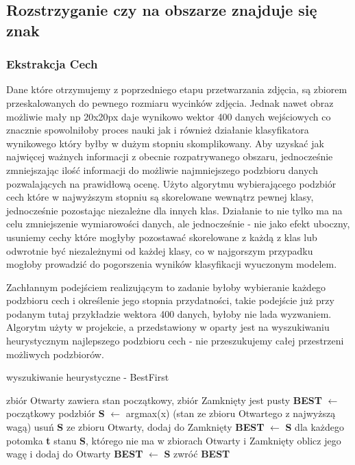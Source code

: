 \documentclass{classrep}
\begin{document}
\subsection{Rozstrzyganie czy na obszarze znajduje się znak}

\subsubsection{Ekstrakcja Cech} 
\label{cfseval}
Dane które otrzymujemy z poprzedniego etapu przetwarzania zdjęcia, są zbiorem przeskalowanych do pewnego rozmiaru wycinków zdjęcia. Jednak nawet obraz możliwie mały np 20x20px daje wynikowo wektor 400 danych wejściowych co znacznie spowolniłoby proces nauki jak i również działanie klasyfikatora wynikowego który byłby w dużym stopniu skomplikowany. Aby uzyskać jak najwięcej ważnych informacji z obecnie rozpatrywanego obszaru, jednocześnie  zmniejszając ilość informacji do możliwie najmniejszego podzbioru danych pozwalających na prawidłową ocenę. Użyto algorytmu wybierającego podzbiór cech które w najwyższym stopniu są skorelowane wewnątrz pewnej klasy, jednocześnie pozostając niezależne dla innych klas. Działanie to nie tylko ma na celu zmniejszenie wymiarowości danych, ale jednocześnie - nie jako efekt uboczny, usuniemy cechy które mogłyby pozostawać skorelowane z każdą z klas lub odwrotnie być niezależnymi od każdej klasy,  co w najgorszym przypadku mogłoby prowadzić do pogorszenia wyników klasyfikacji wyuczonym modelem.

Zachłannym podejściem realizującym to zadanie byłoby wybieranie każdego podzbioru cech i określenie jego stopnia przydatności, takie podejście już przy podanym tutaj przykładzie wektora 400 danych, byłoby nie lada wyzwaniem.\\ 
Algorytm użyty w projekcie, a przedstawiony w \cite{Hall1998} oparty jest na wyszukiwaniu heurystycznym najlepszego podzbioru cech - nie przeszukujemy całej przestrzeni możliwych podzbiorów. 
\begin{algorithm}
\caption{wyszukiwanie heurystyczne - BestFirst}
\label{bestfirst}
\begin{algorithmic}[1]
\STATE zbiór Otwarty zawiera stan początkowy, zbiór Zamknięty jest pusty
\STATE \textbf{BEST} $\leftarrow$ początkowy podzbiór
\STATE \textbf{S} $\leftarrow$ argmax(x) (stan ze zbioru Otwartego z najwyższą wagą)
\STATE usuń \textbf{S} ze zbioru Otwarty, dodaj do Zamknięty
\STATE \textbf{BEST} $\leftarrow$ \textbf{S}
\ENDIF
\STATE dla każdego potomka \textbf{t} stanu \textbf{S}, którego nie ma w zbiorach Otwarty i Zamknięty oblicz jego wagę i dodaj do Otwarty
\STATE \textbf{BEST} $\leftarrow$ \textbf{S}
\ELSE
\STATE zwróć \textbf{BEST}
\ENDIF
\end{algorithmic}
\end{algorithm}
\end{document}
